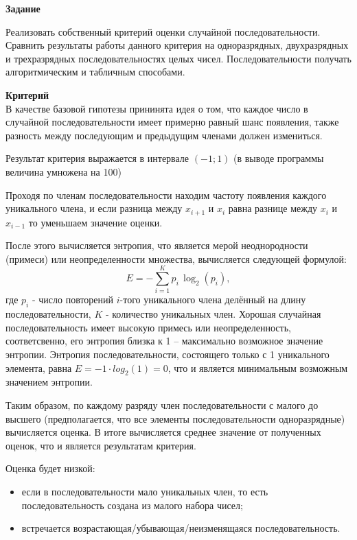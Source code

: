 \textbf{Задание}

Реализовать собственный критерий оценки случайной последовательности. Сравнить результаты работы данного критерия на одноразрядных, двухразрядных и трехразрядных последовательностях целых чисел. Последовательности получать алгоритмическим и табличным способами.


\textbf{Критерий} \\
В качестве базовой гипотезы прининята идея о том, что каждое число в случайной последовательности имеет примерно равный шанс появления,
также 
разность между последующим и предыдущим членами должен измениться.

Результат критерия выражается в интервале $(-1 ; 1)$ (в выводе программы величина умножена на 100)

Проходя по членам последовательности находим частоту появления каждого уникального члена, и если разница между $x_{i+1}$ и $x_{i}$ равна разнице между $x_i$ и $x_{i-1}$ то уменьшаем значение оценки.

После этого вычисляется энтропия, что является мерой неоднородности (примеси) или неопределенности множества, вычисляется следующей формулой:
\begin{equation}
    E = - \sum_{i=1}^{K} p_i \, \log_2(p_i),
\end{equation}
где $p_i$ - число повторений $i$-того уникального члена делённый на длину последовательности, $K$ - количество уникальных член.
Хорошая случайная последовательность  имеет высокую примесь или неопределенность, соответсвенно, его энтропия близка к 1 -- максимально возможное значение энтропии. 
Энтропия последовательности, состоящего только с 1 уникального элемента, равна $E = -1 \cdot log_2(1) = 0$, что и является минимальным возможным значением энтропии. 

Таким образом, по каждому разряду член последовательности с малого до высшего (предполагается, что все элементы последовательности одноразрядные) вычисляется оценка.
В итоге вычисляется среднее значение от полученных оценок, что и является результатам критерия.

Оценка будет низкой:
\begin{itemize}
    \item если в последовательности мало уникальных член, то есть последовательность создана из малого набора чисел;
    \item встречается возрастающая/убывающая/неизменящаяся последовательность.

\end{itemize}


